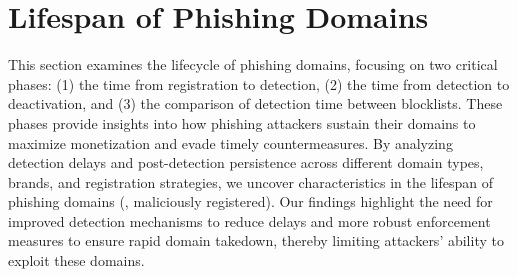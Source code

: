 \section{Lifespan of Phishing Domains}


\label{sec:lifespan}

This section examines the lifecycle of phishing domains, focusing on two critical phases: (1) the time from registration to detection, (2) the time from detection to deactivation, and (3) the comparison of detection time between blocklists. 
These phases provide insights into how phishing attackers sustain their domains to maximize monetization and evade timely countermeasures. 
By analyzing detection delays and post-detection persistence across different domain types, brands, and registration strategies, we uncover characteristics in the lifespan of phishing domains (\ie, maliciously registered). 
Our findings highlight the need for improved detection mechanisms to reduce delays and more robust enforcement measures to ensure rapid domain takedown, thereby limiting attackers' ability to exploit these domains.







